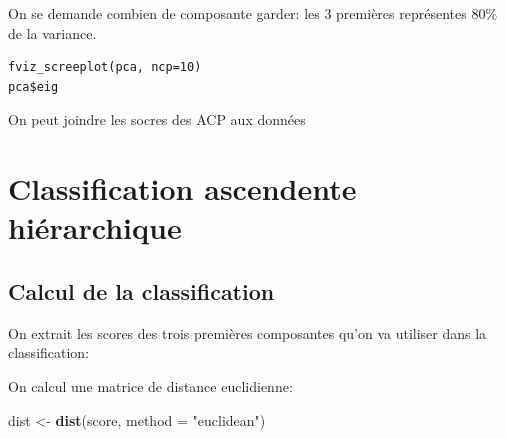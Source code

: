 \documentclass[
]{book}
\newenvironment{Shaded}{\begin{snugshade}}{\end{snugshade}}
\newcommand{\AttributeTok}[1]{\textcolor[rgb]{0.13,0.29,0.53}{#1}}
\newcommand{\DecValTok}[1]{\textcolor[rgb]{0.00,0.00,0.81}{#1}}
\newcommand{\FunctionTok}[1]{\textcolor[rgb]{0.13,0.29,0.53}{\textbf{#1}}}
\newcommand{\NormalTok}[1]{#1}
\newcommand{\OtherTok}[1]{\textcolor[rgb]{0.56,0.35,0.01}{#1}}
\newcommand{\SpecialCharTok}[1]{\textcolor[rgb]{0.81,0.36,0.00}{\textbf{#1}}}
\newcommand{\StringTok}[1]{\textcolor[rgb]{0.31,0.60,0.02}{#1}}
\begin{document}
On se demande combien de composante garder: les 3 premières représentes 80\% de la variance.

\begin{verbatim}
fviz_screeplot(pca, ncp=10)
pca$eig
\end{verbatim}

On peut joindre les socres des ACP aux données

\begin{Shaded}
\end{Shaded}

\hypertarget{classification-ascendente-hiuxe9rarchique}{%
\section{Classification ascendente hiérarchique}\label{classification-ascendente-hiuxe9rarchique}}

\hypertarget{calcul-de-la-classification}{%
\subsection{Calcul de la classification}\label{calcul-de-la-classification}}

On extrait les scores des trois premières composantes qu'on va utiliser dans la classification:

\begin{Shaded}
\end{Shaded}

On calcul une matrice de distance euclidienne:

\begin{Shaded}
\begin{Highlighting}[]
\NormalTok{dist }\OtherTok{\textless{}{-}} \FunctionTok{dist}\NormalTok{(score, }\AttributeTok{method =} \StringTok{"euclidean"}\NormalTok{)}
\end{Highlighting}
\end{Shaded}
\end{document}
